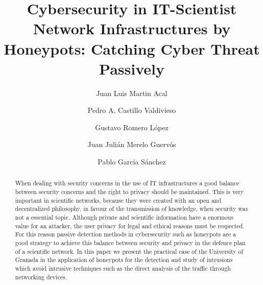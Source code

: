 \documentclass[a4paper]{llncs}
\begin{document}
	
	\pagestyle{empty}
	
	\mainmatter
	
	\title{Cybersecurity in IT-Scientist Network Infrastructures by
		Honeypots: Catching Cyber Threat Passively}
	
	\author{Juan Luis Martin Acal \and Pedro A. Castillo Valdivieso
		\and Gustavo Romero López \and Juan Julián Merelo Guervós \and Pablo García Sánchez }
	
	
	
	\maketitle
	
\begin{abstract}
When dealing with security concerns in the use of IT infrastructures a good balance between security concerns and the right to privacy should be maintained. This is very important in scientific networks, because they were created with an open and decentralized philosophy, in favour of the transmission of knowledge, when security was not a essential topic.
Although private and scientific information have a enormous value for an attacker, the user privacy for legal and ethical reasons must be respected. For this reason passive detection methods in cybersecurity such as honeypots are a good strategy to achieve this balance between security and privacy in the defence plan of a scientific network. In this paper we present the practical case of the University of Granada in the application of honeypots for the detection and study of intrusions which avoid intrusive techniques such as the direct analysis of the traffic through networking devices. 
\end{abstract}
	
\end{document}
